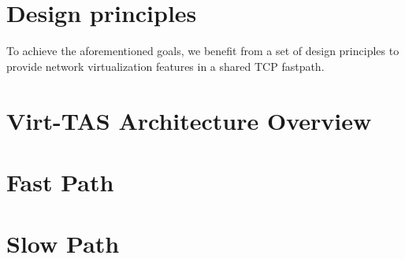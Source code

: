 \section{Design principles}
To achieve the aforementioned goals, we benefit from a set of design principles to provide network virtualization features in a shared TCP fastpath.


\section{Virt-TAS Architecture Overview}

\section{Fast Path}

\section{Slow Path}

